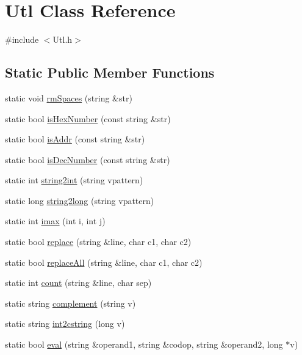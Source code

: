 \hypertarget{classUtl}{}\section{Utl Class Reference}
\label{classUtl}


{\ttfamily \#include $<$Utl.\+h$>$}

\subsection*{Static Public Member Functions}
\begin{DoxyCompactItemize}
\item 
static void \hyperlink{classUtl_a23aae7a1cb208168c7b85bcb365ab096}{rm\+Spaces} (string \&str)
\item 
static bool \hyperlink{classUtl_a67659f76738d22fab7abfdeaa35b72c5}{is\+Hex\+Number} (const string \&str)
\item 
static bool \hyperlink{classUtl_a938efe90aa7bac25352e23841e77ca28}{is\+Addr} (const string \&str)
\item 
static bool \hyperlink{classUtl_aac43171c1e74d7a08caa35ea8652ae67}{is\+Dec\+Number} (const string \&str)
\item 
static int \hyperlink{classUtl_afbefaa2d4f3c3a5df72f7eb4a292a2e0}{string2int} (string vpattern)
\item 
static long \hyperlink{classUtl_a1b9b25dc1c06005add5e2ba44688632f}{string2long} (string vpattern)
\item 
static int \hyperlink{classUtl_aa824770fa334f72507116fff411c42a2}{imax} (int i, int j)
\item 
static bool \hyperlink{classUtl_a4355032aa27e40814e621559f4bf509e}{replace} (string \&line, char c1, char c2)
\item 
static bool \hyperlink{classUtl_a83ad6ff53129a2d3ffae14df4d2c2d9d}{replace\+All} (string \&line, char c1, char c2)
\item 
static int \hyperlink{classUtl_a578a26ee8b9ee68d6759874765b6ffd3}{count} (string \&line, char sep)
\item 
static string \hyperlink{classUtl_adfb7a7b2da6909b23d167047ef950438}{complement} (string v)
\item 
static string \hyperlink{classUtl_abfe3696af92966cdba0868beea93f741}{int2cstring} (long v)
\item 
static bool \hyperlink{classUtl_a86f1f52bdce8adce83ffc0feaa66bf37}{eval} (string \&operand1, string \&codop, string \&operand2, long $\ast$v)
\item 

\end{DoxyCompactItemize}
